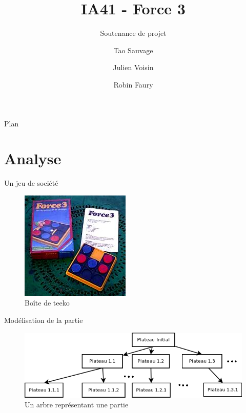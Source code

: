 \documentclass[compress, 12pt]{beamer}
\title{IA41 - Force 3}
\subtitle{Soutenance de projet}
\author{Tao Sauvage \and Julien Voisin \and Robin Faury}
\institute[UTBM]{Université de Technologie de Belfort Montbéliard}
\begin{document}
\begin{frame}
	\titlepage
\end{frame}


\begin{frame}{Plan}
    \tableofcontents
\end{frame}


\section{Analyse}

\begin{frame}{Un jeu de société}
  \begin{figure}
    \includegraphics[height=0.6\textheight]{./pix/plateau}
    \centering
    \caption{Boîte de teeko}
  \end{figure}
\end{frame}


\begin{frame}{Modélisation de la partie}
  \begin{figure}
    \includegraphics[width=\textwidth]{./pix/arbre}
    \centering
    \caption{Un arbre représentant une partie}
  \end{figure}
\end{frame}
\end{document}
